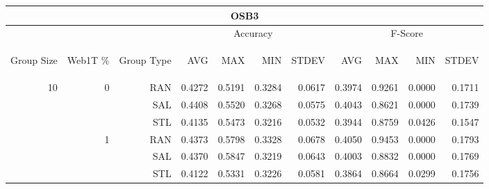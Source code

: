 \begin{center}
\begin{table}[htbp] 
 \begin{center}
\begin{tabular}{ | r | r | r | r | r | r | r | r | r | r | r |}
\hline
\multicolumn{11}{|c|}{OSB3}\\
\hline
 & & & \multicolumn{4}{|c|}{Accuracy} & \multicolumn{4}{|c|}{F-Score}\\ \cline{4-11}
\begin{sideways}Group Size\end{sideways} & \begin{sideways}Web1T \%\end{sideways} & \begin{sideways}Group Type\end{sideways} & \begin{sideways}AVG\end{sideways} & \begin{sideways}MAX\end{sideways} & \begin{sideways}MIN\end{sideways} & \begin{sideways}STDEV\end{sideways} & \begin{sideways}AVG\end{sideways} & \begin{sideways}MAX\end{sideways} & \begin{sideways}MIN\end{sideways} & \begin{sideways}STDEV\end{sideways}\\
\hline
\multirow{15}{*}{10}
 & \multirow{3}{*}{0} & RAN & 0.4272 & 0.5191 & 0.3284 & 0.0617 & 0.3974 & 0.9261 & 0.0000 & 0.1711\\ \cline{3-11}
 &   & SAL & 0.4408 & 0.5520 & 0.3268 & 0.0575 & 0.4043 & 0.8621 & 0.0000 & 0.1739\\ \cline{3-11}
 &   & STL & 0.4135 & 0.5473 & 0.3216 & 0.0532 & 0.3944 & 0.8759 & 0.0426 & 0.1547\\ \cline{2-11}
 & \multirow{3}{*}{1} & RAN & 0.4373 & 0.5798 & 0.3328 & 0.0678 & 0.4050 & 0.9453 & 0.0000 & 0.1793\\ \cline{3-11}
 &   & SAL & 0.4370 & 0.5847 & 0.3219 & 0.0643 & 0.4003 & 0.8832 & 0.0000 & 0.1769\\ \cline{3-11}
 &   & STL & 0.4122 & 0.5331 & 0.3226 & 0.0581 & 0.3864 & 0.8664 & 0.0299 & 0.1756\\ \cline{2-11}

\end{tabular}
\end{center}
\end{table}
\end{center}
